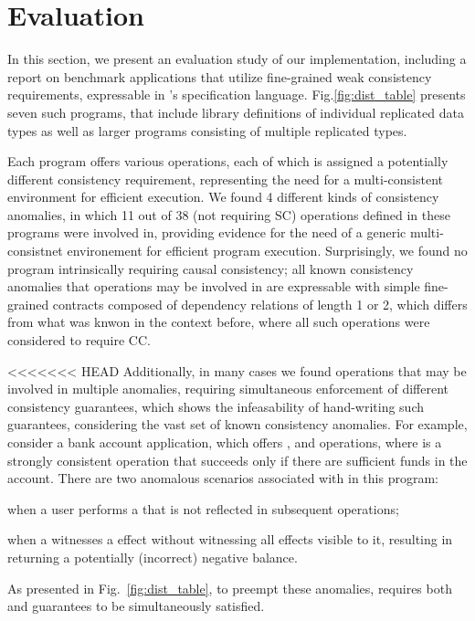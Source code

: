 \newpage
\section{Evaluation}
\label{sec:eval}
%

In this section, we present an evaluation study of our implementation,
including a report on
benchmark applications that utilize fine-grained weak consistency
requirements, expressable
in \tool's specification language.
Fig.\ref{fig:dist_table} presents seven such programs, that include
library definitions of individual replicated data types as well as larger programs consisting of multiple
replicated types. 

Each program offers various operations, each of which is assigned a
potentially different consistency requirement, representing the need
for a multi-consistent environment for efficient execution.  We found
4 different kinds of consistency anomalies, in which 11 out of 38 (not
requiring SC) operations defined in these programs were involved in,
providing evidence for the need of a generic multi-consistnet
environement for efficient program execution.  Surprisingly, we found
no program intrinsically requiring causal consistency; all known
consistency anomalies that operations may be involved in are
expressable with simple fine-grained contracts composed of dependency
relations of length 1 or 2,
which differs from what was knwon in the context before, where all such
operations were considered to require CC.

<<<<<<< HEAD
Additionally, in many cases we found operations that may be involved in
multiple anomalies, requiring simultaneous enforcement of different
consistency guarantees, which shows the infeasability of hand-writing
such guarantees, considering the vast set of known consistency
anomalies. 
%
For example, consider a bank account application, which offers
\dRV{}, \wdRV{} and \gbRV{} operations, where \wdRV{} is a
strongly consistent operation that succeeds only if there are sufficient
funds in the account. There are two anomalous scenarios associated with
\gbRV{} in this program:
\begin{enumerate*}[label=(\roman*)]
\item when a user performs a \dRV{} that is not reflected
in subsequent \gbRV{} operations;
\item when a \gbRV{} witnesses a \wdRV{} effect without witnessing all
\dRV{} effects visible to it,  resulting in \gbRV{} returning a
potentially (incorrect) negative balance.
\end{enumerate*}
As presented in Fig.~\ref{fig:dist_table}, to preempt
these anomalies, \gbRV{} requires
both \rmwCTRT{} and \visCTRT{} guarantees to be simultaneously satisfied.


